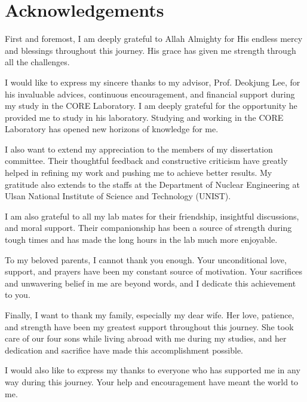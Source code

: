 \section*{\hfill \Large Acknowledgements \hfill}
First and foremost, I am deeply grateful to Allah Almighty for His endless mercy and blessings throughout this journey. His grace has given me strength through all the challenges.

I would like to express my sincere thanks to my advisor, Prof. Deokjung Lee, for his invaluable advices, continuous encouragement, and financial support during my study in the CORE Laboratory. I am deeply grateful for the opportunity he provided me to study in his laboratory. Studying and working in the CORE Laboratory has opened new horizons of knowledge for me.

I also want to extend my appreciation to the members of my dissertation committee. Their thoughtful feedback and constructive criticism have greatly helped in refining my work and pushing me to achieve better results. My gratitude also extends to the staffs at the Department of Nuclear Engineering at Ulsan National Institute of Science and Technology (UNIST).

I am also grateful to all my lab mates for their friendship, insightful discussions, and moral support. Their companionship has been a source of strength during tough times and has made the long hours in the lab much more enjoyable. 

To my beloved parents, I cannot thank you enough. Your unconditional love, support, and prayers have been my constant source of motivation. Your sacrifices and unwavering belief in me are beyond words, and I dedicate this achievement to you.

Finally, I want to thank my family, especially my dear wife. Her love, patience, and strength have been my greatest support throughout this journey. She took care of our four sons while living abroad with me during my studies, and her dedication and sacrifice have made this accomplishment possible.

I would also like to express my thanks to everyone who has supported me in any way during this journey. Your help and encouragement have meant the world to me.
\clearpage